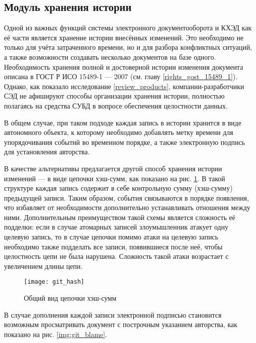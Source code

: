 \subsection{Модуль хранения истории} \label{research_history}

Одной из важных функций системы электронного документооборота и КХЭД как её части является хранение истории внесённых изменений. Это необходимо не только для учёта затраченного времени, но и для разбора конфликтных ситуаций, а также возможности создавать несколько документов на базе одного. Необходимость хранения полной и достоверной истории изменения документа описана в ГОСТ Р ИСО 15489-1 --- 2007 (см. главу \ref{rights_gost_15489_1}). Однако, как показало исследование \ref{review_products}, компании-разработчики СЭД не афишируют способы организации хранения истории, полностью полагаясь на средства СУБД в вопросе обеспечения целостности данных.

\vspace{\baselineskip}
В общем случае, при таком подходе каждая запись в истории хранится в виде автономного объекта, к которому необходимо добавлять метку времени для упорядочивания событий во временн\textit{о}м порядке, а также электронную подпись для установления авторства.

\vspace{\baselineskip}
В качестве альтернативы предлагается другой способ хранения истории изменений --- в виде цепочки хэш-сумм, как показано на рис. \ref{img:git_hash}. В такой структуре каждая запись содержит в себе контрольную сумму (хэш-сумму) предыдущей записи. Таким образом, события связываются в порядке появления, что избавляет от необходимости дополнительно устанавливать отношения между ними. Дополнительным преимуществом такой схемы является сложность её подделки: если в случае атомарных записей злоумышленник атакует одну целевую запись, то в случае цепочки помимо атаки на целевую запись необходимо также подделать все записи, появившиеся после неё, чтобы целостность цепи не была нарушена. Сложность такой атаки возрастает с увеличением длины цепи.
\begin{figure}[h!]
  \centering
  \texttt{[image: git\_hash]}
  \caption{Общий вид цепочки хэш-сумм}
  \label{img:git_hash}
\end{figure}

\vspace{\baselineskip}
В случае дополнения каждой записи электронной подписью становится возможным просматривать документ с построчным указанием авторства, как показано на рис. \ref{img:git_blame}.

